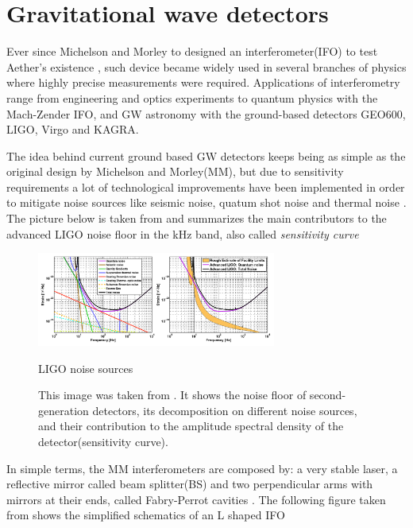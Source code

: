 \section{Gravitational wave detectors}

Ever since Michelson and Morley to designed an interferometer(IFO) to test Aether's existence \cite{Michelson333}, such device became widely used in several branches of physics where highly precise measurements were required. Applications of interferometry range from engineering and optics experiments to  quantum physics with the Mach-Zender IFO, and GW astronomy with the ground-based detectors GEO600, LIGO, Virgo and KAGRA.

The idea behind current ground based GW detectors keeps being as simple as the original design by Michelson and Morley(MM), but due to sensitivity requirements a lot of technological improvements have been implemented in order to mitigate noise sources like seismic noise, quatum shot noise and thermal noise \cite{LIGOScientific:2013pcc}. The picture below is taken from \cite{Hild_2012} and summarizes the main contributors to the advanced LIGO noise floor in the kHz band, also called \textit{sensitivity curve}  


\begin{figure}[hbt!]
\begin{center}
\includegraphics[width=0.7\textwidth, angle=0]{images/aligo.png}
\captionsetup{width=0.8\textwidth}
\caption{LIGO noise sources}
\caption*{This image was taken from \cite{Hild_2012}. It shows the noise floor of second-generation detectors, its decomposition on different noise sources, and their contribution to the amplitude spectral density of the detector(sensitivity curve).}
\label{LIGO}
\end{center}
\end{figure}
\FloatBarrier

In simple terms, the MM interferometers are composed by: a very stable laser, a reflective mirror called beam splitter(BS) and two perpendicular arms with mirrors at their ends, called Fabry-Perrot cavities \cite{Saulson:1995zi}. The following figure taken from \cite{Hild_2012} shows the simplified schematics of an L shaped IFO   


